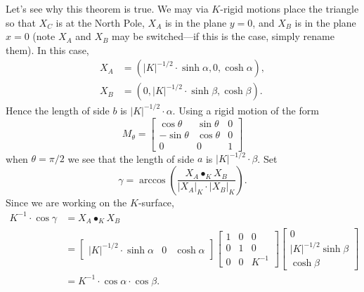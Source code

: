 \documentclass{ximera}
\begin{document}
Let's see why this theorem is true.  We may via $K$-rigid motions
place the triangle so that $X_C$ is at the North Pole, $X_A$ is in the
plane $y=0$, and $X_B$ is in the plane $x=0$ (note $X_A$ and $X_B$ may
be switched---if this is the case, simply rename them). In this case,
\begin{align*}
  X_A &= (|K|^{-1/2}\cdot \sinh\alpha, 0, \cosh\alpha),\\
  X_B &= (0, |K|^{-1/2}\cdot \sinh \beta, \cosh\beta).
\end{align*}
Hence the length of side $b$ is $|K|^{-1/2}\cdot\alpha$. Using a rigid motion of the form
\[
M_\theta=
\begin{bmatrix}
  \cos\theta & \sin\theta & 0\\
  -\sin\theta & \cos\theta & 0\\
  0 & 0 & 1
\end{bmatrix}
\]
when $\theta = \pi/2$ we see that the length of side $a$ is $|K|^{-1/2}\cdot
\beta$. Set
\[
\gamma = \arccos\left(\frac{X_A\bullet_K X_B}{|X_A|_K\cdot |X_B|_K}\right).
\]
Since we are working on the $K$-surface,
\begin{align*}
  K^{-1}\cdot \cos \gamma &= X_A\bullet_K X_B\\
  &=
  \begin{bmatrix}
    |K|^{-1/2}\cdot \sinh\alpha &  0 & \cosh\alpha
  \end{bmatrix}
    \begin{bmatrix}
      1 & 0 & 0\\
      0 & 1 & 0\\
      0 & 0 & K^{-1}
    \end{bmatrix}
    \begin{bmatrix}
      0\\
      |K|^{-1/2}\sinh\beta\\
      \cosh\beta
    \end{bmatrix}\\
   &=K^{-1} \cdot \cos\alpha \cdot \cos\beta.
  \end{align*}
\end{document}
